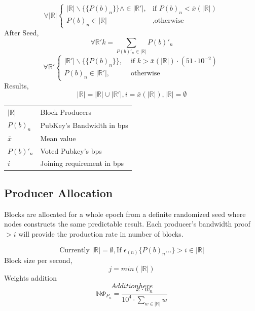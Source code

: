 \documentclass[a4paper,10pt]{article}
\makeatletter
\newenvironment{conditions}
  {\par\vspace{\abovedisplayskip}\noindent\begin{tabular}{>{$}l<{$} @{${}={}$} l}}
  {\end{tabular}\par\vspace{\belowdisplayskip}}
\makeatother
\begin{document}
\begin{equation*}
\forall |\mathbb{R}| \begin{cases}
|\mathbb{R}| \backslash \{\{P(b)_n\}\} \wedge \in |\mathbb{R}'|, & \text{if } P(b)_n < \bar{x}(|\mathbb{R}|) \\
P(b)_n \in |\mathbb{R}|  & \text{,otherwise}
\end{cases}
\end{equation*}
After Seed,
\begin{equation*}
\forall \mathbb{R'} k = \sum_{P(b)'_n \in |\mathbb{R}|} P(b)'_n
\end{equation*}
\begin{equation*}
\forall \mathbb{R'} \begin{cases}
|\mathbb{R}'| \backslash \{\{P(b)_n\}\}, & \text{ if } k > \bar{x}(|\mathbb{R}|) \cdot (51 \cdot 10^{-2})\\
P(b)_n \in |\mathbb{R}'|, & \text{ otherwise}
\end{cases}
\end{equation*}
Results, 
\begin{equation*}
|\mathbb{R}| = |\mathbb{R}| {\displaystyle \cup } |\mathbb{R}'|, i = \bar{x}(|\mathbb{R}|), |\mathbb{R}|=\emptyset
\end{equation*}
\begin{conditions}
|\mathbb{R}| & Block Producers\\
P(b)_n & PubKey's Bandwidth in bps \\
\bar{x} & Mean value\\
P(b)'_n & Voted Pubkey's bps\\
i & Joining requirement in bps 
\end{conditions}

\subsection{Producer Allocation}

Blocks are allocated for a whole epoch from a definite randomized seed where nodes constructs the same predictable result. Each producer's bandwidth proof $> i$ will provide the production rate in number of blocks.

\begin{equation*}
\text{Currently }|\mathbb{R}| = \emptyset, 
\text{If } \epsilon_{(n)}\{P(b)_n...\} > i \in |\mathbb{R}|
\end{equation*}
Block size per second,
\begin{equation*}
j=min(|\mathbb{R}|)
\end{equation*}
Weights addition
\begin{equation*}
Addition here
\end{equation*}
\begin{equation*}
\mathbb{N} \Phi_{P_n} = \frac{x \cdot w_n}{10^4 \cdot \sum_{w \in |\mathbb{R}|} w}
\end{equation*}
\end{document}
